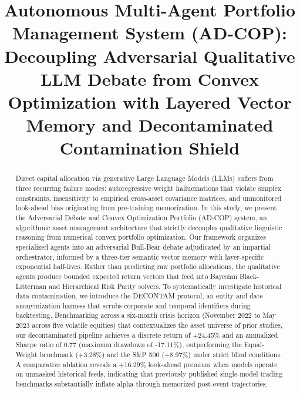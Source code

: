 \documentclass[conference]{IEEEtran}
\begin{document}
\title{Autonomous Multi-Agent Portfolio Management System (AD-COP): Decoupling Adversarial Qualitative LLM Debate from Convex Optimization with Layered Vector Memory and Decontaminated Contamination Shield}

\author{
}

\maketitle

\begin{abstract}
Direct capital allocation via generative Large Language Models (LLMs) suffers from three recurring failure modes: autoregressive weight hallucinations that violate simplex constraints, insensitivity to empirical cross-asset covariance matrices, and unmonitored look-ahead bias originating from pre-training memorization. In this study, we present the Adversarial Debate and Convex Optimization Portfolio (AD-COP) system, an algorithmic asset management architecture that strictly decouples qualitative linguistic reasoning from numerical convex portfolio optimization. Our framework organizes specialized agents into an adversarial Bull-Bear debate adjudicated by an impartial orchestrator, informed by a three-tier semantic vector memory with layer-specific exponential half-lives. Rather than predicting raw portfolio allocations, the qualitative agents produce bounded expected return vectors that feed into Bayesian Black-Litterman and Hierarchical Risk Parity solvers. To systematically investigate historical data contamination, we introduce the DECONTAM protocol, an entity and date anonymization harness that scrubs corporate and temporal identifiers during backtesting. Benchmarking across a six-month crisis horizon (November 2022 to May 2023 across five volatile equities) that contextualizes the asset universe of prior studies, our decontaminated pipeline achieves a discrete return of +24.45\% and an annualized Sharpe ratio of 0.77 (maximum drawdown of -17.11\%), outperforming the Equal-Weight benchmark (+3.28\%) and the S\&P 500 (+8.97\%) under strict blind conditions. A comparative ablation reveals a +16.29\% look-ahead premium when models operate on unmasked historical feeds, indicating that previously published single-model trading benchmarks substantially inflate alpha through memorized post-event trajectories.
\end{abstract}
\end{document}
